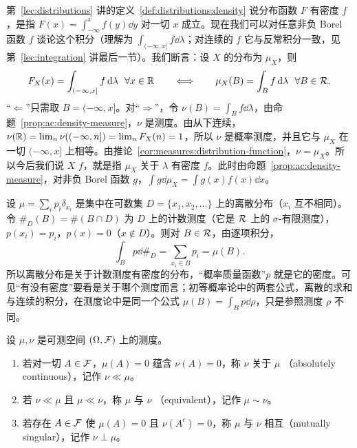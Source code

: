 \begin{example}[有密度的分布]\label{ex:ac:density}
第~\ref{lec:distributions} 讲的定义~\ref{def:distributions:density} 说分布函数 $F$ 有密度 $f$，是指 $F(x)=\int_{-\infty}^xf(y)\dd y$ 对一切 $x$ 成立。现在我们可以对任意非负 Borel 函数 $f$ 谈论这个积分（理解为 $\int_{(-\infty,x]}f\dd\lambda$；对连续的 $f$ 它与反常积分一致，见第~\ref{lec:integration} 讲最后一节）。我们断言：设 $X$ 的分布为 $\mu_X$，则
\[
F_X(x)=\int_{(-\infty,x]}f\dd\lambda\ \ \forall x\in\R\qquad\Longleftrightarrow\qquad\mu_X(B)=\int_Bf\dd\lambda\ \ \forall B\in\cR .
\]
“$\Leftarrow$”只需取 $B=(-\infty,x]$。对“$\Rightarrow$”，令 $\nu(B)=\int_Bf\dd\lambda$，由命题~\ref{prop:ac:density-measure}，$\nu$ 是测度。由从下连续，$\nu(\mathbb{R})=\lim_n\nu((-\infty,n])=\lim_nF_X(n)=1$，所以 $\nu$ 是概率测度，并且它与 $\mu_X$ 在一切 $(-\infty,x]$ 上相等。由推论~\ref{cor:measures:distribution-function}，$\nu=\mu_X$。所以今后我们说 $X$  $f$，就是指 $\mu_X$ 关于 $\lambda$ 有密度 $f$。此时由命题~\ref{prop:ac:density-measure}，对非负 Borel 函数 $g$，$\int g\dd\mu_X=\int g(x)f(x)\dd x$。
\end{example}

\begin{example}[离散分布也是有密度的分布]
设 $\mu=\sum_ip_i\delta_{x_i}$ 是集中在可数集 $D=\{x_1,x_2,\dots\}$ 上的离散分布（$x_i$ 互不相同）。令 $\#_D(B)=\#(B\cap D)$ 为 $D$ 上的计数测度（它是 $\mathcal{R}$ 上的 $\sigma$-有限测度），$p(x_i)=p_i$，$p(x)=0$（$x\notin D$）。则对 $B\in\mathcal{R}$，由逐项积分，
\[
\int_Bp\dd\#_D=\sum_{x_i\in B}p_i=\mu(B).
\]
所以离散分布是关于计数测度有密度的分布，“概率质量函数”$p$ 就是它的密度。可见“有没有密度”要看是关于哪个测度而言；初等概率论中的两套公式，离散的求和与连续的积分，在测度论中是同一个公式 $\mu(B)=\int_Bp\dd\rho$，只是参照测度 $\rho$ 不同。
\end{example}


\begin{definition}[绝对连续，奇异]\label{def:ac:ac-singular}
设 $\mu,\nu$ 是可测空间 $(\Omega,\mathcal{F})$ 上的测度。
\begin{enumerate}
\item 若对一切 $A\in\mathcal{F}$，$\mu(A)=0$ 蕴含 $\nu(A)=0$，称 $\nu$ 关于 $\mu$ （absolutely continuous），记作 $\nu\ll\mu$。
\item 若 $\nu\ll\mu$ 且 $\mu\ll\nu$，称 $\mu$ 与 $\nu$ （equivalent），记作 $\mu\sim\nu$。
\item 若存在 $A\in\mathcal{F}$ 使 $\mu(A)=0$ 且 $\nu(A^c)=0$，称 $\mu$ 与 $\nu$ 相互（mutually singular），记作 $\nu\perp\mu$。
\end{enumerate}
\end{definition}


